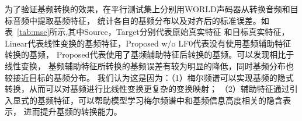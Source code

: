 为了验证基频转换的效果，在平行测试集上分别用WORLD声码器从转换音频和目标音频中提取基频特征，
统计各自的基频分布以及对齐后的标准误差。如表~\ref{tab:mse}所示,其中Source，Target分别代表原始真实特征
和目标真实特征，Linear代表线性变换的基频特征，Proposed w/o LF0代表没有使用基频辅助特征转换的基频，
Proposed代表使用了基频辅助特征后转换的基频。可以发现相比于线性变换，
基频辅助特征所转换的基频误差有较为明显的降低，同时基频分布也较接近目标的基频分布。
我们认为这是因为：（1）梅尔频谱可以实现基频的隐式转换，从而可以对基频进行比线性变换更复杂的变换映射；
（2）辅助特征通过引入显式的基频特征，可以帮助模型学习梅尔频谱中和基频信息高度相关的隐含表示，
进而提升基频的转换能力。


